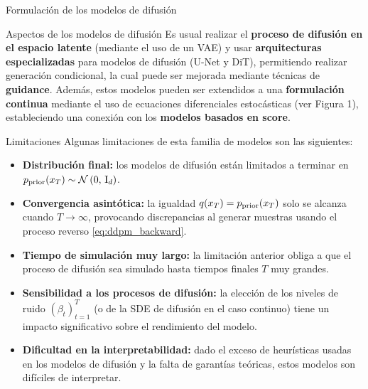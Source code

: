 \documentclass[final]{beamer}
\newlength{\colwidth}
\begin{document}
\begin{frame}[t]
\begin{columns}[t]
\begin{column}{\colwidth}
\begin{block}{Formulación de los modelos de difusión}
      \end{block}

      \begin{block}{Aspectos de los modelos de difusión}
        Es usual realizar el \textbf{proceso de difusión en el espacio latente} (mediante el uso de un VAE) y usar \textbf{arquitecturas especializadas} para modelos de difusión (U-Net y DiT), permitiendo realizar generación condicional, la cual puede ser mejorada mediante técnicas de \textbf{guidance}. Además, estos modelos pueden ser extendidos a una \textbf{formulación continua} mediante el uso de ecuaciones diferenciales estocásticas (ver Figura 1), estableciendo una conexión con los \textbf{modelos basados en score}.

      \end{block}

      \begin{alertblock}{Limitaciones}
        Algunas limitaciones de esta familia de modelos son las siguientes:

        \begin{itemize}
          \item \textbf{Distribución final:} los modelos de difusión están limitados a terminar en $p_{\operatorname{prior}}(x_T)\sim\mathcal{N}\left(0,\,\operatorname{I}_{d}\right)$.
          \item \textbf{Convergencia asintótica:} la igualdad $q(x_T)=p_{\operatorname{prior}}(x_T)$ solo se alcanza cuando $T\to\infty$, provocando discrepancias al generar muestras usando el proceso reverso \eqref{eq:ddpm_backward}.
          \item \textbf{Tiempo de simulación muy largo:} la limitación anterior obliga a que el proceso de difusión sea simulado hasta tiempos finales $T$ muy grandes.
          \item \textbf{Sensibilidad a los procesos de difusión:} la elección de los niveles de ruido $(\beta_t)_{t=1}^T$ (o de la SDE de difusión en el caso continuo) tiene un impacto significativo sobre el rendimiento del modelo.
          \item \textbf{Dificultad en la interpretabilidad:} dado el exceso de heurísticas usadas en los modelos de difusión y la falta de garantías teóricas, estos modelos son difíciles de interpretar.
        \end{itemize}

      \end{alertblock}


\end{column}
\end{columns}
\end{frame}
\end{document}
